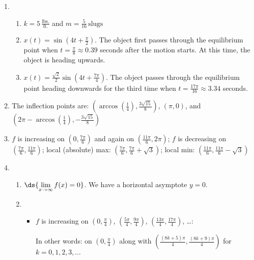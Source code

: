 \documentclass{ximera}
\begin{document}
\begin{enumerate}
\setcounter{enumi}{\value{HW}}
\addtocounter{enumi}{1}

\item  \begin{enumerate} \item $k = 5 \, \frac{\text{lbs.}}{\text{ft.}}$ and $m = \frac{5}{16} \, \text{slugs}$

\item  $x(t) = \sin\left(4t + \frac{\pi}{2}\right)$.  The object first passes through the equilibrium point when $t = \frac{\pi}{8} \approx 0.39$ seconds after the motion starts.  At this time, the object is heading upwards.

\item  $x(t) = \frac{\sqrt{2}}{2} \sin\left(4t + \frac{7\pi}{4}\right)$.  The object passes through the equilibrium point heading downwards for the third time when $t = \frac{17\pi}{16} \approx 3.34$ seconds.

\end{enumerate}

\setcounter{HW}{\value{enumi}}

\item  The inflection points are:  $\left( \arccos\left(\frac{1}{4}\right), \frac{3 \sqrt{15}}{8} \right)$, $( \pi, 0)$, and $\left( 2\pi - \arccos\left(\frac{1}{4}\right), - \frac{3 \sqrt{15}}{8} \right)$

\item  $f$ is increasing on $\left(0, \frac{7\pi}{6} \right)$ and again on $\left(\frac{11\pi}{6}, 2\pi \right)$;  $f$ is decreasing on  $\left(\frac{7 \pi}{6}, \frac{11\pi}{6} \right)$; local (absolute) max:  $\left(\frac{7\pi}{6}, \frac{7\pi}{6} + \sqrt{3}\right)$; local min:  $\left(\frac{11\pi}{6}, \frac{11\pi}{6} - \sqrt{3}\right)$

\item  \begin{enumerate} \item  $\ds{\lim_{x \rightarrow \infty} f(x) = 0}$.  We have a horizontal asymptote $y = 0$. 

\item  \begin{itemize} \item $f$ is increasing on $\left(0, \frac{\pi}{4} \right)$, $\left(\frac{5\pi}{4}, \frac{9 \pi}{4} \right)$, $\left(\frac{13\pi}{4}, \frac{17 \pi}{4} \right)$, \ldots :  

\smallskip

In other words: on $\left(0, \frac{\pi}{4} \right)$ along with $\left( \frac{(8k+5) \pi}{4}, \frac{(8k+9)\pi}{4}\right)$ for $k = 0, 1, 2, 3, \ldots$


\end{itemize}
\end{enumerate}
\end{enumerate}
\end{document}
